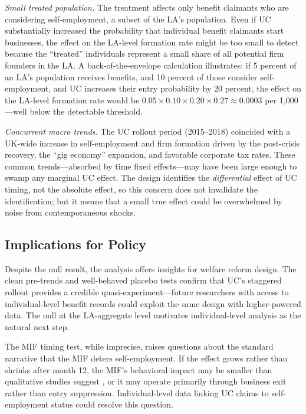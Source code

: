 \documentclass[12pt]{article}
\begin{document}
\textit{Small treated population.} The treatment affects only benefit claimants who are considering self-employment, a subset of the LA's population. Even if UC substantially increased the probability that individual benefit claimants start businesses, the effect on the LA-level formation rate might be too small to detect because the ``treated'' individuals represent a small share of all potential firm founders in the LA. A back-of-the-envelope calculation illustrates: if 5 percent of an LA's population receives benefits, and 10 percent of those consider self-employment, and UC increases their entry probability by 20 percent, the effect on the LA-level formation rate would be $0.05 \times 0.10 \times 0.20 \times 0.27 \approx 0.0003$ per 1,000---well below the detectable threshold.

\textit{Concurrent macro trends.} The UC rollout period (2015--2018) coincided with a UK-wide increase in self-employment and firm formation driven by the post-crisis recovery, the ``gig economy'' expansion, and favorable corporate tax rates. These common trends---absorbed by time fixed effects---may have been large enough to swamp any marginal UC effect. The design identifies the \textit{differential} effect of UC timing, not the absolute effect, so this concern does not invalidate the identification; but it means that a small true effect could be overwhelmed by noise from contemporaneous shocks.

\subsection{Implications for Policy}

Despite the null result, the analysis offers insights for welfare reform design. The clean pre-trends and well-behaved placebo tests confirm that UC's staggered rollout provides a credible quasi-experiment---future researchers with access to individual-level benefit records could exploit the same design with higher-powered data. The null at the LA-aggregate level motivates individual-level analysis as the natural next step.

The MIF timing test, while imprecise, raises questions about the standard narrative that the MIF deters self-employment. If the effect grows rather than shrinks after month 12, the MIF's behavioral impact may be smaller than qualitative studies suggest \citep{griffiths2024going}, or it may operate primarily through business exit rather than entry suppression. Individual-level data linking UC claims to self-employment status could resolve this question.
\end{document}
